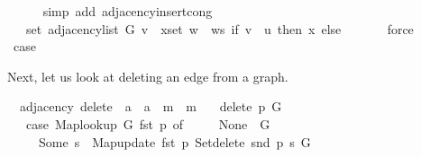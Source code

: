 \begin{isabellebody}
\ \ \ \ \isamarkupfalse%
\ {\isacharparenleft}{\kern0pt}simp\ add{\isacharcolon}{\kern0pt}\ adjacency{\isacharunderscore}{\kern0pt}insert{\isacharprime}{\kern0pt}{\isacharunderscore}{\kern0pt}cong{\isacharparenright}{\kern0pt}\isanewline
\ \ \isamarkupfalse%
\ \isamarkupfalse%
\ {\isachardoublequoteopen}{\isachardot}{\kern0pt}{\isachardot}{\kern0pt}{\isachardot}{\kern0pt}\ {\isacharequal}{\kern0pt}\ set\ {\isacharparenleft}{\kern0pt}adjacency{\isacharunderscore}{\kern0pt}list\ G\ v{\isacharparenright}{\kern0pt}\ {\isasymunion}\ {\isacharparenleft}{\kern0pt}{\isasymUnion}x{\isasymin}set\ {\isacharparenleft}{\kern0pt}w\ {\isacharhash}{\kern0pt}\ ws{\isacharparenright}{\kern0pt}{\isachardot}{\kern0pt}\ if\ v\ {\isacharequal}{\kern0pt}\ u\ then\ {\isacharbraceleft}{\kern0pt}x{\isacharbraceright}{\kern0pt}\ else\ {\isacharbraceleft}{\kern0pt}{\isacharbraceright}{\kern0pt}{\isacharparenright}{\kern0pt}{\isachardoublequoteclose}\isanewline
\ \ \ \ \isamarkupfalse%
\ force\isanewline
\ \ \isamarkupfalse%
\ \isamarkupfalse%
\ {\isacharquery}{\kern0pt}case\isanewline
\ \ \ \ \isacommand{{\isachardot}{\kern0pt}}\isamarkupfalse%
\isanewline
{}\isamarkupfalse%
%
\endisatagproof
{\isafoldproof}%
%
\isadelimproof
%
\endisadelimproof
%
\begin{isamarkuptext}%
Next, let us look at deleting an edge from a graph.%
\end{isamarkuptext}\isamarkuptrue%
\isamarkupfalse%
\ {\isacharparenleft}{\kern0pt}\ adjacency{\isacharparenright}{\kern0pt}\ delete\ {\isacharcolon}{\kern0pt}{\isacharcolon}{\kern0pt}\ {\isachardoublequoteopen}{\isacharprime}{\kern0pt}a\ {\isasymtimes}\ {\isacharprime}{\kern0pt}a\ {\isasymRightarrow}\ {\isacharprime}{\kern0pt}m\ {\isasymRightarrow}\ {\isacharprime}{\kern0pt}m{\isachardoublequoteclose}\ \isanewline
\ \ {\isachardoublequoteopen}delete\ p\ G\ {\isasymequiv}\isanewline
\ \ \ case\ Map{\isacharunderscore}{\kern0pt}lookup\ G\ {\isacharparenleft}{\kern0pt}fst\ p{\isacharparenright}{\kern0pt}\ of\isanewline
\ \ \ \ \ None\ {\isasymRightarrow}\ G\ {\isacharbar}{\kern0pt}\isanewline
\ \ \ \ \ Some\ s\ {\isasymRightarrow}\ Map{\isacharunderscore}{\kern0pt}update\ {\isacharparenleft}{\kern0pt}fst\ p{\isacharparenright}{\kern0pt}\ {\isacharparenleft}{\kern0pt}Set{\isacharunderscore}{\kern0pt}delete\ {\isacharparenleft}{\kern0pt}snd\ p{\isacharparenright}{\kern0pt}\ s{\isacharparenright}{\kern0pt}\ G{\isachardoublequoteclose}\isanewline

\end{isabellebody}
